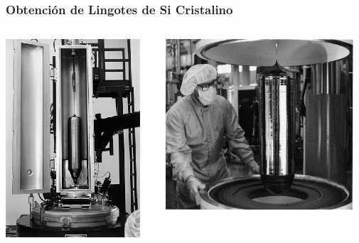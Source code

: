 \documentclass[aspectratio=169,10pt]{beamer}
\begin{document}
\begin{frame}
\frametitle{Obtención de Lingotes de Si Cristalino}
\centering
\begin{columns}
	\begin{column}{0.5\textwidth}
		\centering
		\includegraphics[width=5cm]{czochralski2}
	\end{column}
	\begin{column}{0.5\textwidth}
		\centering
		\includegraphics[width=7cm]{czochralski3}
	\end{column}
\end{columns}
\end{frame}
\end{document}
